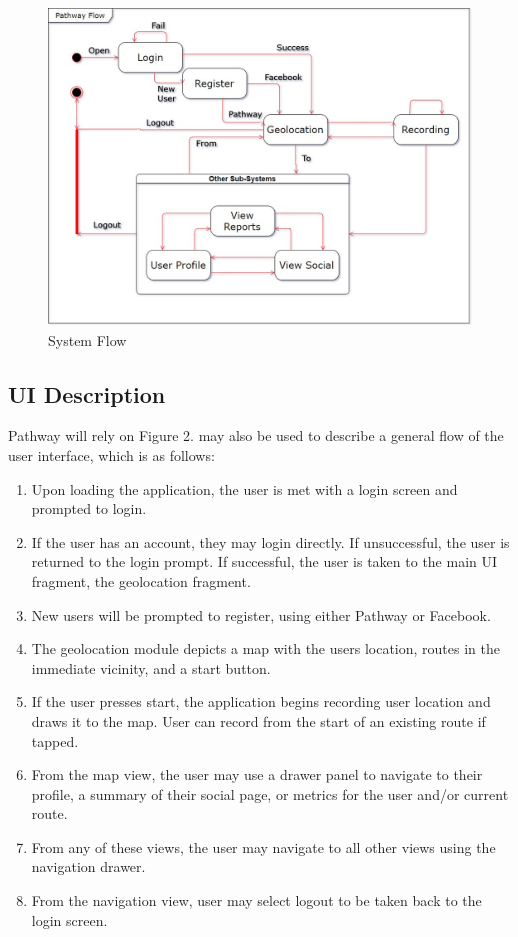 ﻿\documentclass{article}
\begin{document}
\begin{figure}[!htb]
    \centering
    \includegraphics[width=\textwidth]{systemFlow.jpg}
    \caption{System Flow}
    \label{fig:my_label}
\end{figure}

\subsection{UI Description}
Pathway will rely on 
Figure 2. may also be used to describe a general flow of the user interface, which is as follows:
\begin{enumerate}
    \item Upon loading the application, the user is met with a login screen and prompted to login.
    \item If the user has an account, they may login directly.
    \subitem If unsuccessful, the user is returned to the login prompt.
    \subitem If successful, the user is taken to the main UI fragment, the geolocation fragment.
    \item New users will be prompted to register, using either Pathway or Facebook.
    \item The geolocation module depicts a map with the users location, routes in the immediate vicinity, and a start button.
    \item If the user presses start, the application begins recording user location and draws it to the map.
    \subitem User can record from the start of an existing route if tapped.
    \item From the map view, the user may use a drawer panel to navigate to their profile, a summary of their social page, or metrics for the user and/or current route.
    \item From any of these views, the user may navigate to all other views using the navigation drawer.
    \item From the navigation view, user may select logout to be taken back to the login screen.
\end{enumerate}
\end{document}
